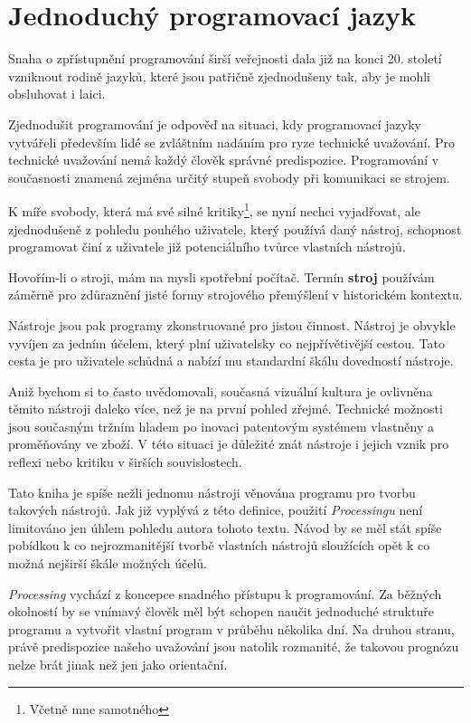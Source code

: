 \documentclass[10pt,twoside=true,open=right,cleardoublepage=empty,chapterprefix=true]{scrbook}
\newcommand{\oddil}[1]{\section{#1}\index{#1}\label{#1}}
\newcommand{\slovnik}[1]{\textbf{\gls{#1}}\index{#1}\label{#1}}
\begin{document}
\oddil{Jednoduchý programovací jazyk}

Snaha o zpřístupnění programování širší veřejnosti dala již na konci 20. století vzniknout rodině jazyků, které jsou patřičně zjednodušeny tak, aby je mohli obsluhovat i laici.

Zjednodušit programování je odpověď na situaci, kdy programovací jazyky vytvářeli především lidé se zvláštním nadáním pro ryze technické uvažování. Pro technické uvažování nemá každý člověk správné predispozice. Programování v současnosti znamená zejména určitý stupeň svobody při komunikaci se strojem.

K míře svobody, která má své silné kritiky\footnote{Včetně mne samotného}, se nyní nechci vyjadřovat, ale zjednodušeně z pohledu pouhého uživatele, který používá daný nástroj, schopnost programovat činí z uživatele již potenciálního tvůrce vlastních nástrojů.

Hovořím-li o stroji, mám na mysli spotřební počítač. Termín \slovnik{stroj} používám záměrně pro zdůraznění jisté formy strojového přemýšlení v historickém kontextu.

Nástroje jsou pak programy zkonstruované pro jistou činnost. Nástroj je obvykle vyvíjen za jedním účelem, který plní uživatelsky co nejpřívětivější cestou. Tato cesta je pro uživatele schůdná a nabízí mu standardní škálu dovedností nástroje.

Aniž bychom si to často uvědomovali, současná vizuální kultura je ovlivněna těmito nástroji daleko více, než je na první pohled zřejmé. Technické možnosti jsou současným tržním hladem po inovaci patentovým systémem vlastněny a proměňovány ve zboží. V této situaci je důležité znát nástroje i jejich vznik pro reflexi nebo kritiku v širších souvislostech.

Tato kniha je spíše nežli jednomu nástroji věnována programu pro tvorbu takových nástrojů. Jak již vyplývá z této definice, použití {\em Processingu} není limitováno jen úhlem pohledu autora tohoto textu. Návod by se měl stát spíše pobídkou k co nejrozmanitější tvorbě vlastních nástrojů sloužících opět k co možná nejširší škále možných účelů.

{\em Processing} vychází z koncepce snadného přístupu k programování. Za běžných okolností by se vnímavý člověk měl být schopen naučit jednoduché struktuře programu a vytvořit vlastní program v průběhu několika dní. Na druhou stranu, právě predispozice našeho uvažování jsou natolik rozmanité, že takovou prognózu nelze brát jinak než jen jako orientační.
\end{document}
